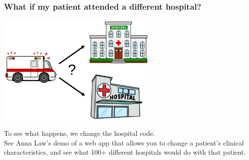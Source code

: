 \begin{frame}
\frametitle{What if my patient attended a different hospital?}
\begin{center}
\includegraphics[width=0.60\textwidth]{./images/two_hopsitals}
\end{center}
\pause

To see what happens, we change the hospital code. \\
\vspace{1mm}
See Anna Law's demo of a web app that allows you to change a patient's clinical characteristics, and see what 100+ different hospitals would do with that patient.

\end{frame}